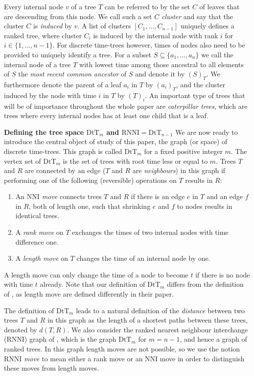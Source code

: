 \documentclass[11pt]{amsart}
\newcommand{\rnni}{\mathrm{RNNI}}
\newcommand{\nni}{\mathrm{NNI}}
\newcommand{\dtt}{\mathrm{DtT}}
\newcommand{\summary}[1]{\textbf{#1}} %
\begin{document}
Every internal node $v$ of a tree $T$ can be referred to by the set $C$ of leaves that are descending from this node.
We call such a set $C$ \emph{cluster} and say that the cluster $C$ is \emph{induced} by $v$.
A list of clusters $[C_1, \ldots, C_{n-1}]$ uniquely defines a ranked tree, where cluster $C_i$ is induced by the internal node with rank $i$ for $i \in \{1, \ldots, n-1\}$.
For discrete time-trees however, times of nodes also need to be provided to uniquely identify a tree.
For a subset $S \subseteq \{a_1, \ldots, a_n\}$ we call the internal node of a tree $T$ with lowest time among those ancestral to all elements of $S$ the \emph{most recent common ancestor} of $S$ and denote it by $(S)_T$.
We furthermore denote the parent of a leaf $a_i$ in $T$ by $(a_i)_T$, and the cluster induced by the node with time $i$ in $T$ by $(T)_i$.
An important type of trees that will be of importance throughout the whole paper are \emph{caterpillar trees}, which are trees where every internal nodes has at least one child that is a leaf.

\summary{Defining the tree space $\dtt_m$ and $\rnni = \dtt_{n-1}$}
We are now ready to introduce the central object of study of this paper, the graph (or space) of discrete time-trees.
This graph is called $\dtt_m$ for a fixed positive integer $m$.
The vertex set of $\dtt_m$ is the set of trees with root time less or equal to $m$.
Trees $T$ and $R$ are connected by an edge ($T$ and $R$ are \emph{neighbours}) in this graph if performing one of the following (reversible) operations on $T$ results in $R$:
\begin{enumerate}
	\item An \emph{$\nni$ move} connects trees $T$ and $R$ if there is an edge $e$ in $T$ and an edge $f$ in $R$, both of length one, such that shrinking $e$ and $f$ to nodes results in identical trees.
	\item A \emph{rank move} on $T$ exchanges the times of two internal nodes with time difference one.
	\item A \emph{length move} on $T$ changes the time of an internal node by one.
\end{enumerate}
A length move can only change the time of a node to become $t$ if there is no node with time $t$ already.
Note that our definition of $\dtt_m$ differs from the definition of \textcite{Gavryushkin2018-ol}, as length move are defined differently in their paper.

The definition of $\dtt_m$ leads to a natural definition of the \emph{distance} between two trees $T$ and $R$ in this graph as the length of a shortest paths between these trees, denoted by $d(T,R)$.
We also consider the ranked nearest neighbour interchange ($\rnni$) graph of \textcite{Collienne2020-iu}, which is the graph $\dtt_m$ for $m=n-1$, and hence a graph of ranked trees.
In this graph length moves are not possible, so we use the notion $\rnni$ \emph{move} to mean either a rank move or an $\nni$ move in order to distinguish these moves from length moves.
\end{document}
